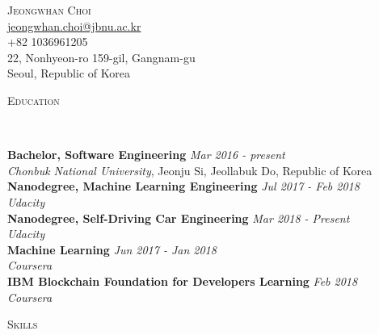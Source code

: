 \documentclass[10pt]{article}
\newenvironment{changemargin}[2]{
  \begin{list}{}{
    \setlength{\topsep}{0pt}
    \setlength{\leftmargin}{#1}
    \setlength{\rightmargin}{#2}
    \setlength{\listparindent}{\parindent}
    \setlength{\itemindent}{\parindent}
    \setlength{\parsep}{\parskip}
  }
  \item[]}{\end{list}
}
\newcommand{\lineover}{
	\begin{changemargin}{-0.05in}{-0.05in}
		\vspace*{-8pt}
		\hrulefill \\
		\vspace*{-2pt}
	\end{changemargin}
}
\newcommand{\header}[1]{
	\begin{changemargin}{-0.5in}{-0.5in}
		\scshape{#1}\\
  	\lineover
	\end{changemargin}
}
\newcommand{\contact}[5]{
	\begin{changemargin}{-0.5in}{-0.5in}
		\begin{center}
			{\Large \scshape {#1}}\\
      {#2} \\  {#3} \\ {#4} \\ {#5}
		\end{center}
	\end{changemargin}
}
\newenvironment{body} {
	\vspace*{-16pt}
	\begin{changemargin}{-0.25in}{-0.5in}
  }
	{\end{changemargin}
}
\begin{document}

\contact{Jeongwhan Choi}{\href{mailto:email@address.com}{jeongwhan.choi@jbnu.ac.kr}}{+82 1036961205}{22, Nonhyeon-ro 159-gil, Gangnam-gu}{Seoul, Republic of Korea}


\header{Education}

\begin{body}
	\vspace{14pt}
	\textbf{Bachelor, Software Engineering} \hfill \emph{Mar 2016 - present} \\
	\emph{Chonbuk National University}, Jeonju Si, Jeollabuk Do, Republic of Korea \\
	
	\vspace{14pt}
	\textbf{Nanodegree, Machine Learning Engineering} \hfill \emph{Jul 2017 - Feb 2018} \\
	\emph{Udacity} \\
	
	\vspace{14pt}
	\textbf{Nanodegree, Self-Driving Car Engineering} \hfill \emph{Mar 2018 - Present} \\
	\emph{Udacity} \\

	\vspace{14pt}
	\textbf{Machine Learning} \hfill \emph{Jun 2017 - Jan 2018} \\
	\emph{Coursera} \\
	
	\vspace{14pt}
	\textbf{IBM Blockchain Foundation for Developers Learning} \hfill \emph{Feb 2018} \\
	\emph{Coursera} \\


\end{body}

\medskip



\header{Skills}
\end{document}
